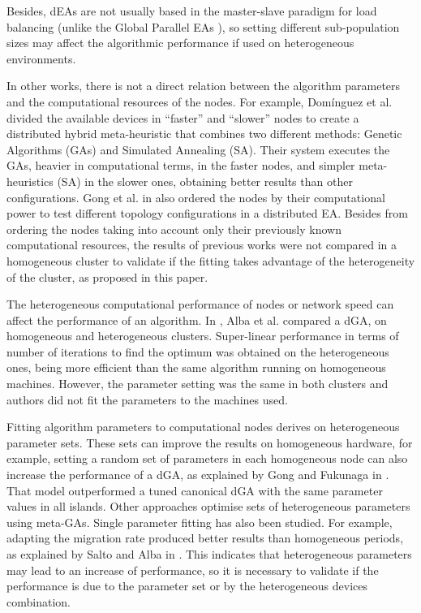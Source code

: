 \documentclass[final,1p,times]{elsarticle}
\begin{document}
 Besides, dEAs are not usually based in the master-slave paradigm for
load balancing (unlike the Global Parallel EAs
\cite{alba2002parallelism}), so setting different sub-population sizes
may affect the algorithmic performance if used on heterogeneous
environments. 

In other works, there is not a direct relation between the algorithm parameters and the
computational resources of the nodes. For example, Dom\'inguez et al. \cite{HYDROCM} 
divided the available devices in ``faster'' and ``slower'' nodes to create a distributed hybrid 
meta-heuristic that combines two different methods: Genetic Algorithms (GAs) and Simulated
Annealing (SA). Their system executes the GAs, heavier in computational
terms, in the faster nodes, and
simpler meta-heuristics (SA) in the slower ones, obtaining better results
than other configurations.  Gong et al. in \cite{HETEROGENEOUSTOPOLOGY} also ordered 
the nodes by their computational power to test different topology configurations in a distributed EA.
Besides from ordering the nodes taking into account 
only their previously known computational resources, the results of previous works were not compared in a homogeneous 
cluster to validate if the fitting takes advantage of the heterogeneity 
of the cluster, as proposed in this paper.

The heterogeneous computational performance of nodes or network speed can affect the performance of an algorithm. In \cite{HETEROGENEOUSHARD},
 Alba et al. compared a dGA, 
 on homogeneous and heterogeneous clusters. 
 Super-linear performance in terms of number of iterations to find the optimum was obtained on the heterogeneous ones,
 being more efficient than the same algorithm running on homogeneous
 machines. However, the parameter setting was the same in both
 clusters and authors did not fit the parameters to the machines used. 



Fitting algorithm parameters to computational nodes derives on heterogeneous parameter sets. These sets can improve the results on homogeneous hardware, for example, setting a random set of parameters in each homogeneous node can also increase the
performance of a dGA, as explained by Gong
and Fukunaga in \cite{HETEROGENEOUSPARAMETERS}. That model
outperformed a tuned canonical dGA with the same parameter values in
all islands. Other approaches \cite{PanaceasClune05,ParallelGATongchim02} optimise sets of heterogeneous parameters using meta-GAs. Single parameter fitting has also been  studied. For example, adapting the migration rate produced better
results than homogeneous periods, as explained by Salto and Alba in
\cite{HETEROGENEOUSMIGRATION}. This indicates that heterogeneous parameters
 may lead to an increase of performance, so it is necessary to validate if the 
 performance is due to the parameter set or by the heterogeneous devices combination.
\end{document}
